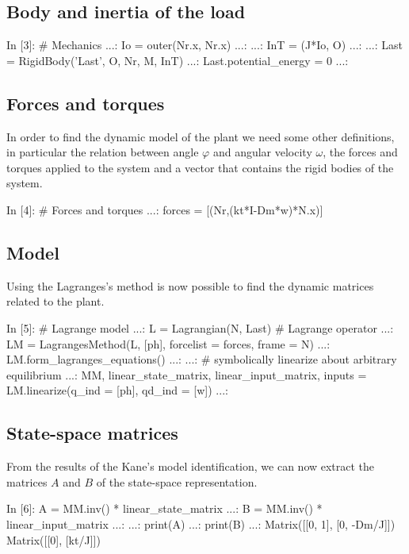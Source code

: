 \subsection{Body and inertia of the load}
\begin{code}
In [3]: # Mechanics
   ...: Io = outer(Nr.x, Nr.x)
   ...: 
   ...: InT = (J*Io, O)
   ...: 
   ...: Last = RigidBody('Last', O, Nr, M, InT)
   ...: Last.potential_energy = 0
   ...: 
\end{code}

\subsection{Forces and torques}
In order to find the dynamic model of the plant we need some other definitions, 
in particular the relation between angle $\varphi$ and angular velocity 
$\omega$, the forces and torques applied to the system and a vector that 
contains the rigid bodies of the system.

\begin{code}
In [4]: # Forces and torques
   ...: forces = [(Nr,(kt*I-Dm*w)*N.x)]
\end{code}

\subsection{Model}

Using the Lagranges's method is now possible to find the dynamic matrices related to the plant.

\begin{code}
In [5]: # Lagrange model
   ...: L = Lagrangian(N, Last)    # Lagrange operator
   ...: LM = LagrangesMethod(L, [ph], forcelist = forces, frame = N)
   ...: LM.form_lagranges_equations()
   ...: 
   ...: # symbolically linearize about arbitrary equilibrium
   ...: MM, linear_state_matrix, linear_input_matrix, inputs = LM.linearize(q_ind = [ph], qd_ind = [w])
   ...: 
\end{code}

\subsection{State-space matrices}
From the results of the Kane's model identification, we can now extract the 
matrices $A$ and $B$ of the state-space representation.

\begin{code}
In [6]: A = MM.inv() * linear_state_matrix
   ...: B = MM.inv() * linear_input_matrix
   ...: 
   ...: print(A)
   ...: print(B)
   ...: 
Matrix([[0, 1], [0, -Dm/J]])
Matrix([[0], [kt/J]])
\end{code}

